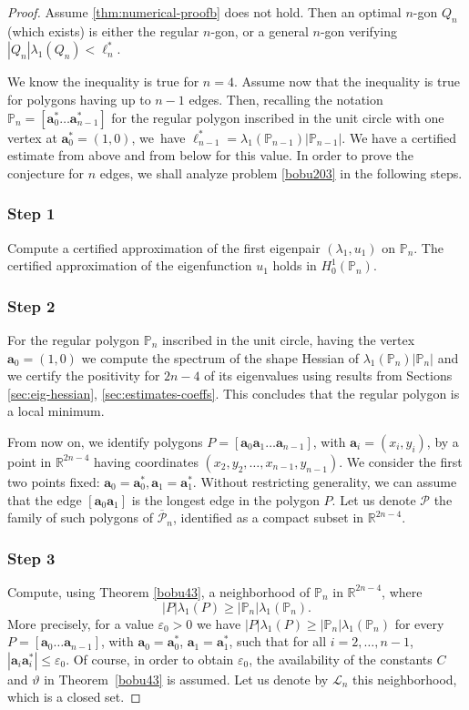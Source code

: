 \documentclass[11pt]{article}
\numberwithin{equation}{section}\newtheorem*{jepEnonce}{\jepEnonceTitle}\newenvironment{enonce*}[1]{\def\jepEnonceTitle{#1}\jepEnonce}{\endjepEnonce}\newtheorem*{conj*}{Conjecture}
\theoremstyle{plain}
\theoremstyle{definition}
\newcommand{\bo}[1]{{\boldsymbol#1}}
\let\Bbb\mathbb
\def\R{\mathbb{R}}
\newcommand{\vps}{\varepsilon}
\newcommand{\lb}{\lambda}
\newcommand{\ov}{\overline}
\begin{document}
\begin{proof}
Assume \eqref{thm:numerical-proofb} does not hold. Then an optimal $n$-gon $Q_n$ (which exists) is either the regular $n$-gon, or a general $n$-gon verifying $|Q_n|\lambda_1(Q_n) < \ell_n^*$.

We know the inequality is true for $n=4$. Assume now that the inequality is true for polygons having up to $n-1$ edges. Then, recalling the notation $\Bbb{P}_n=[\bo a_0^*\dots\bo a_{n-1}^*]$ for the regular polygon inscribed in the unit circle with one vertex at $\bo a_0^*=(1,0)$, we~have $\ell_{n-1}^* = \lambda_1(\Bbb P_{n-1})|\Bbb P_{n-1}|$.
We have a certified estimate from above and from below for this value. In order to prove the conjecture for $n$ edges, we shall analyze problem \eqref{bobu203} in the following steps.

\subsubsection*{Step 1} Compute a certified approximation of the first eigenpair $(\lb_1, u_1)$ on $\Bbb P_{n}$. The certified approximation of the eigenfunction $u_1$ holds in $H^1_0(\Bbb P_n)$.

\subsubsection*{Step 2} For the regular polygon $\Bbb{P}_n$ inscribed in the unit circle, having the vertex $\bo a_0 = (1,0)$ we compute the spectrum of the shape Hessian of $\lambda_1(\Bbb P_n)|\Bbb P_n|$ and we certify the positivity for $2n-4$ of its eigenvalues using results from Sections \ref{sec:eig-hessian}, \ref{sec:estimates-coeffs}. This concludes that the regular polygon is a local minimum.

From now on, we identify polygons $P=[\bo a_0\bo a_1\dots \bo a_{n-1}]$, with $\bo a_i=(x_i,y_i)$, by a point in $ \R^{2n-4}$ having coordinates $(x_2,y_2, \dots, x_{n-1}, y_{n-1})$. We consider the first two points fixed: $\bo a_0=\bo a_0^*, \bo a_1=\bo a_1^*$. Without restricting generality, we can assume that the edge $[\bo a_0\bo a_1]$ is the longest edge in the polygon $P$. Let us denote $\mathcal P$ the family of such polygons of $\ov {\mathcal P}_n$, identified as a compact subset in $\R^{2n-4}$.

\subsubsection*{Step 3} Compute, using Theorem \ref{bobu43}, a neighborhood of $\Bbb P_{n}$ in $\R^{2n-4}$, where
\[
|P|\lb_1(P) \ge |\Bbb P_n|\lb_1(\Bbb P_n).
\]
More precisely, for a value $\vps_0>0$ we have $|P| \lb_1(P) \ge |\Bbb{P}_n| \lb_1(\Bbb P_n)$ for every $P=[\bo a_0\dots \bo a_{n-1}]$, with $\bo a_0=\bo a_0^*$, $\bo a_1=\bo a_1^*$, such that for all $i=2,\dots, n-1$, $ |\bo a_i\bo a_i^*| \le \vps _0$. Of course, in order to obtain $\vps_0$, the availability of the constants $C$ and $ \vartheta$ in Theorem~\ref{bobu43} is assumed. Let us denote by $\mathcal L_n$ this neighborhood, which is a closed set.


\end{proof}
\end{document}
